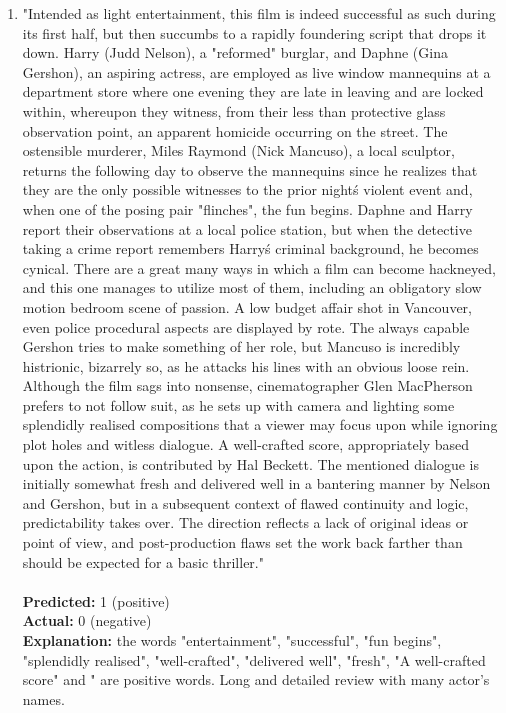 \documentclass{article}
\begin{document}
\begin{enumerate}
    \item "Intended as light entertainment, this film is indeed successful as such during its first half,
    but then succumbs to a rapidly foundering script that drops it down. Harry (Judd Nelson), a "reformed"
    burglar, and Daphne (Gina Gershon), an aspiring actress, are employed as live window mannequins at a
    department store where one evening they are late in leaving and are locked within, whereupon they witness,
    from their less than protective glass observation point, an apparent homicide occurring on the street.
    The ostensible murderer, Miles Raymond (Nick Mancuso), a local sculptor, returns the following day to
    observe the mannequins since he realizes that they are the only possible witnesses to the prior night\'s
    violent event and, when one of the posing pair "flinches", the fun begins. Daphne and Harry report their
    observations at a local police station, but when the detective taking a crime report remembers Harry\'s
    criminal background, he becomes cynical. There are a great many ways in which a film can become hackneyed,
    and this one manages to utilize most of them, including an obligatory slow motion bedroom scene of
    passion. A low budget affair shot in Vancouver, even police procedural aspects are displayed by rote.
    The always capable Gershon tries to make something of her role, but Mancuso is incredibly histrionic,
    bizarrely so, as he attacks his lines with an obvious loose rein. Although the film sags into nonsense,
    cinematographer Glen MacPherson prefers to not follow suit, as he sets up with camera and lighting some
    splendidly realised compositions that a viewer may focus upon while ignoring plot holes and witless
    dialogue. A well-crafted score, appropriately based upon the action, is contributed by Hal Beckett.
    The mentioned dialogue is initially somewhat fresh and delivered well in a bantering manner by Nelson
    and Gershon, but in a subsequent context of flawed continuity and logic, predictability takes over.
    The direction reflects a lack of original ideas or point of view, and post-production flaws set the work
    back farther than should be expected for a basic thriller."\\\\
    \textbf{Predicted:} 1 (positive)\\
    \textbf{Actual:} 0 (negative)\\
    \textbf{Explanation:} the words "entertainment", "successful", "fun begins", "splendidly realised", "well-crafted", "delivered well", "fresh", "A well-crafted score" and " are positive words. Long and detailed review with
    many actor's names.
\end{enumerate}
\end{document}

